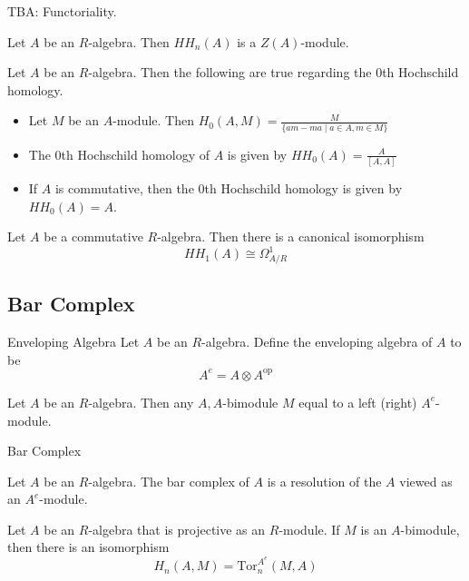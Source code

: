 \documentclass[a4paper]{article}
\begin{document}
TBA: Functoriality. 

\begin{prp}{}{} Let $A$ be an $R$-algebra. Then $HH_n(A)$ is a $Z(A)$-module. 
\end{prp}

\begin{prp}{}{} Let $A$ be an $R$-algebra. Then the following are true regarding the $0$th Hochschild homology. 
\begin{itemize}
\item Let $M$ be an $A$-module. Then $H_0(A,M)=\frac{M}{\{am-ma\;|\;a\in A, m\in M\}}$
\item The $0$th Hochschild homology of $A$ is given by $HH_0(A)=\frac{A}{[A,A]}$
\item If $A$ is commutative, then the $0$th Hochschild homology is given by $HH_0(A)=A$. 
\end{itemize}
\end{prp}

\begin{thm}{}{} Let $A$ be a commutative $R$-algebra. Then there is a canonical isomorphism $$HH_1(A)\cong\Omega_{A/R}^1$$
\end{thm}

\subsection{Bar Complex}
\begin{defn}{Enveloping Algebra}{} Let $A$ be an $R$-algebra. Define the enveloping algebra of $A$ to be $$A^e=A\otimes A^\text{op}$$
\end{defn}

\begin{prp}{}{} Let $A$ be an $R$-algebra. Then any $A,A$-bimodule $M$ equal to a left (right) $A^e$-module. 
\end{prp}

\begin{defn}{Bar Complex}{}
\end{defn}

\begin{prp}{}{} Let $A$ be an $R$-algebra. The bar complex of $A$ is a resolution of the $A$ viewed as an $A^e$-module. 
\end{prp}

\begin{thm}{}{} Let $A$ be an $R$-algebra that is projective as an $R$-module. If $M$ is an $A$-bimodule, then there is an isomorphism $$H_n(A,M)=\text{Tor}_n^{A^e}(M,A)$$
\end{thm}
\end{document}
